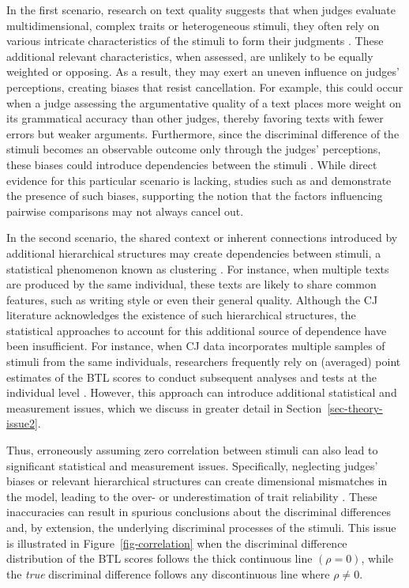 \documentclass[
  authoryear,
  review,
  1p]{elsarticle}
\begin{document}
In the first scenario, research on text quality suggests that when
judges evaluate multidimensional, complex traits or heterogeneous
stimuli, they often rely on various intricate characteristics of the
stimuli to form their judgments
\citep{vanDaal_et_al_2016, Lesterhuis_2018, Chambers_et_al_2022}. These
additional relevant characteristics, when assessed, are unlikely to be
equally weighted or opposing. As a result, they may exert an uneven
influence on judges' perceptions, creating biases that resist
cancellation. For example, this could occur when a judge assessing the
argumentative quality of a text places more weight on its grammatical
accuracy than other judges, thereby favoring texts with fewer errors but
weaker arguments. Furthermore, since the discriminal difference of the
stimuli becomes an observable outcome only through the judges'
perceptions, these biases could introduce dependencies between the
stimuli \citep{vanderLinden_et_al_2017_II}. While direct evidence for
this particular scenario is lacking, studies such as
\citet{Pollitt_et_al_2003} and \citet{vanDaal_et_al_2016} demonstrate
the presence of such biases, supporting the notion that the factors
influencing pairwise comparisons may not always cancel out.

In the second scenario, the shared context or inherent connections
introduced by additional hierarchical structures may create dependencies
between stimuli, a statistical phenomenon known as clustering
\citep{Everitt_et_al_2010}. For instance, when multiple texts are
produced by the same individual, these texts are likely to share common
features, such as writing style or even their general quality. Although
the CJ literature acknowledges the existence of such hierarchical
structures, the statistical approaches to account for this additional
source of dependence have been insufficient. For instance, when CJ data
incorporates multiple samples of stimuli from the same individuals,
researchers frequently rely on (averaged) point estimates of the BTL
scores to conduct subsequent analyses and tests at the individual level
\citep{Bramley_et_al_2019, Boonen_et_al_2020, Bouwer_et_al_2023, vanDaal_et_al_2017, Jones_et_al_2019, Gijsen_et_al_2021}.
However, this approach can introduce additional statistical and
measurement issues, which we discuss in greater detail in
Section~\ref{sec-theory-issue2}.

Thus, erroneously assuming zero correlation between stimuli can also
lead to significant statistical and measurement issues. Specifically,
neglecting judges' biases or relevant hierarchical structures can create
dimensional mismatches in the model, leading to the over- or
underestimation of trait reliability
\citep{Ackerman_1989, Hoyle_et_al_2023}. These inaccuracies can result
in spurious conclusions about the discriminal differences
\citep{McElreath_2020} and, by extension, the underlying discriminal
processes of the stimuli. This issue is illustrated in
Figure~\ref{fig-correlation} when the discriminal difference
distribution of the BTL scores follows the thick continuous line
\((\rho = 0)\), while the \emph{true} discriminal difference follows any
discontinuous line where \(\rho \neq 0\).
\end{document}
